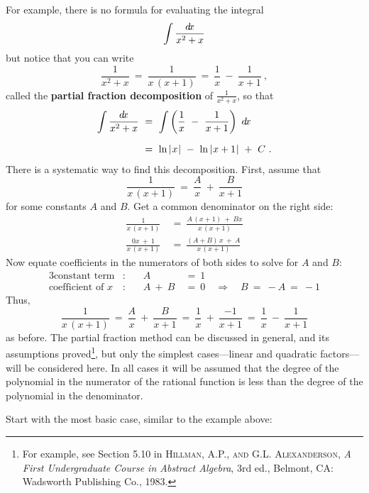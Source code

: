For example, there is no formula for evaluating the integral
\[
\int \frac{d\!x}{x^2 + x}
\]
but notice that you can write
\[
\frac{1}{x^2 + x} ~=~ \frac{1}{x\,(x+1)} ~=~ \frac{1}{x} ~-~ \frac{1}{x+1} ~,
\]
called the \textbf{partial fraction decomposition} of $\frac{1}{x^2 + x}$, so
that
\begin{align*}
\int \frac{d\!x}{x^2 + x} ~&=~ \int \left(\frac{1}{x} ~-~ \frac{1}{x+1}\right)~d\!x\\[6pt]
&=~ \ln\,\lvert\mspace{1mu}x\mspace{1mu}\rvert ~-~ \ln\,\lvert\mspace{1mu}x+1\mspace{1mu}\rvert ~+~ C ~.
\end{align*}
There is a systematic way to find this decomposition. First, assume that
\[
\frac{1}{x\,(x+1)} ~=~ \frac{A}{x} ~+~ \frac{B}{x+1}
\]
for some constants $A$ and $B$. Get a common denominator on the right side:
\begin{align*}
\frac{1}{x\,(x+1)} ~&=~ \frac{A\,(x+1) ~+~ Bx}{x\,(x+1)}\\[4pt]
\frac{0x ~+~ 1}{x\,(x+1)} ~&=~ \frac{(A + B)\,x ~+~ A}{x\,(x+1)}
\end{align*}
Now equate coefficients in the numerators of both sides to solve for $A$ and
$B$:
\begin{alignat*}{3}
\text{constant term}&: & A ~&=~ 1\\
\text{coefficient of $x$}&: \quad & A ~+~ B ~&=~ 0 \quad\Rightarrow\quad B ~=~ -A ~=~ -1
\end{alignat*}
Thus,
\[
\frac{1}{x\,(x+1)} ~=~ \frac{A}{x} ~+~ \frac{B}{x+1} ~=~ \frac{1}{x} ~+~ \frac{-1}{x+1}
~=~ \frac{1}{x} ~-~ \frac{1}{x+1}
\]
as before.
\newpage
The partial fraction method can be discussed in general, and its
assumptions proved\footnote{For example, see Section 5.10 in \textsc{Hillman,
A.P., and G.L. Alexanderson}, \emph{A First Undergraduate Course in Abstract
Algebra}, 3rd ed., Belmont, CA: Wadsworth Publishing Co., 1983.}, but only the
simplest cases---linear and quadratic factors--- will be considered here.
In all cases it will be assumed that the degree of the polynomial in the
numerator of the rational function is less than the degree of the polynomial in
the denominator.

Start with the most basic case, similar to the example above:

\label{cmnt:part-frac-case-1}

